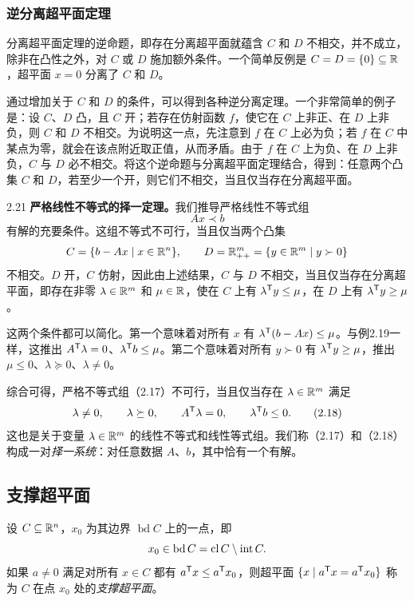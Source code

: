 \subsubsection*{逆分离超平面定理}
分离超平面定理的逆命题，即存在分离超平面就蕴含 $C$ 和 $D$ 不相交，并不成立，除非在凸性之外，对 $C$ 或 $D$ 施加额外条件。一个简单反例是 $C=D=\{0\}\subseteq\mathbb R$，超平面 $x=0$ 分离了 $C$ 和 $D$。

通过增加关于 $C$ 和 $D$ 的条件，可以得到各种逆分离定理。一个非常简单的例子是：设 $C$、$D$ 凸，且 $C$ 开；若存在仿射函数 $f$，使它在 $C$ 上非正、在 $D$ 上非负，则 $C$ 和 $D$ 不相交。为说明这一点，先注意到 $f$ 在 $C$ 上必为负；若 $f$ 在 $C$ 中某点为零，就会在该点附近取正值，从而矛盾。由于 $f$ 在 $C$ 上为负、在 $D$ 上非负，$C$ 与 $D$ 必不相交。将这个逆命题与分离超平面定理结合，得到：任意两个凸集 $C$ 和 $D$，若至少一个开，则它们不相交，当且仅当存在分离超平面。

\begin{origexample}{2.21}
\textbf{严格线性不等式的择一定理。}我们推导严格线性不等式组
\begin{equation}
 Ax\prec b\tag{2.17}
\end{equation}
有解的充要条件。这组不等式不可行，当且仅当两个凸集
\[
 C=\{b-Ax\mid x\in\mathbb R^n\},\qquad
 D=\mathbb R_{++}^m=\{y\in\mathbb R^m\mid y\succ0\}
\]
不相交。$D$ 开，$C$ 仿射，因此由上述结果，$C$ 与 $D$ 不相交，当且仅当存在分离超平面，即存在非零 $\lambda\in\mathbb R^m$ 和 $\mu\in\mathbb R$，使在 $C$ 上有 $\lambda^{\mathsf T}y\le\mu$，在 $D$ 上有 $\lambda^{\mathsf T}y\ge\mu$。

这两个条件都可以简化。第一个意味着对所有 $x$ 有 $\lambda^{\mathsf T}(b-Ax)\le\mu$。与例2.19一样，这推出 $A^{\mathsf T}\lambda=0$、$\lambda^{\mathsf T}b\le\mu$。第二个意味着对所有 $y\succ0$ 有 $\lambda^{\mathsf T}y\ge\mu$，推出 $\mu\le0$、$\lambda\succeq0$、$\lambda\ne0$。

综合可得，严格不等式组（2.17）不可行，当且仅当存在 $\lambda\in\mathbb R^m$ 满足
\begin{equation}
 \lambda\ne0,\qquad\lambda\succeq0,\qquad
 A^{\mathsf T}\lambda=0,\qquad\lambda^{\mathsf T}b\le0.\tag{2.18}
\end{equation}
这也是关于变量 $\lambda\in\mathbb R^m$ 的线性不等式和线性等式组。我们称（2.17）和（2.18）构成一对\emph{择一系统}：对任意数据 $A$、$b$，其中恰有一个有解。
\end{origexample}

\subsection{支撑超平面}
设 $C\subseteq\mathbb R^n$，$x_0$ 为其边界 $\operatorname{bd}C$ 上的一点，即
\[
 x_0\in\operatorname{bd}C=\operatorname{cl} C\setminus\operatorname{int}C.
\]
如果 $a\ne0$ 满足对所有 $x\in C$ 都有 $a^{\mathsf T}x\le a^{\mathsf T}x_0$，则超平面 $\{x\mid a^{\mathsf T}x=a^{\mathsf T}x_0\}$ 称为 $C$ 在点 $x_0$ 处的\emph{支撑超平面}。
